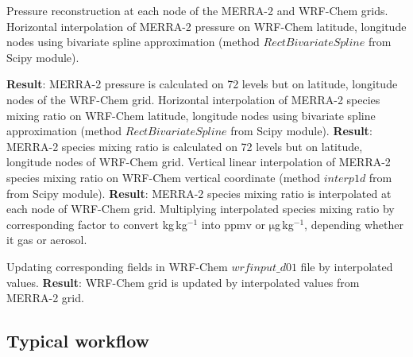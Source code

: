 \documentclass{article}
\newcommand{\unit}[1]{\ensuremath{\mathrm{#1}}}
\newcommand{\multiline}[1]{#1}
\begin{document}
\begin{algorithm}
\caption{Interpolation procedure applied to initial conditions.}
\label{fig:figA2}
\begin{algorithmic}[1]
    \State Pressure reconstruction at each node of the MERRA-2 and WRF-Chem grids.
    \Statex
\State \multiline{%
Horizontal interpolation of MERRA-2 pressure on WRF-Chem latitude, longitude nodes using bivariate spline approximation (method $RectBivariateSpline$ from Scipy module).}

	\EndFor
	\State \textbf{Result}: MERRA-2 pressure is calculated on 72 levels but on latitude, longitude nodes of the WRF-Chem grid.
    \Statex
            \State \multiline{%
            Horizontal interpolation of MERRA-2 species mixing ratio on WRF-Chem latitude, longitude nodes using bivariate spline approximation (method $RectBivariateSpline$ from Scipy module).}
        \EndFor
        \State \multiline{%
        \textbf{Result}: MERRA-2 species mixing ratio is calculated on 72 levels but on latitude, longitude nodes of WRF-Chem grid.}
        \Statex
        \Statex
            \State \multiline{%
            Vertical linear interpolation of MERRA-2 species mixing ratio on WRF-Chem vertical coordinate (method $interp1d$ from from Scipy module). }
        \EndFor
        \State \multiline{%
        \textbf{Result}: MERRA-2 species mixing ratio is interpolated at each node of WRF-Chem grid.}
        \Statex
        \Statex
        \State \multiline{%
        Multiplying interpolated species mixing ratio by corresponding factor to convert kg\,kg$^{-1}$ into \unit{ppmv} or \unit{\mu}g\,kg$^{-1}$, depending whether it gas or aerosol.}
        
        \State \multiline{%
        Updating corresponding fields in WRF-Chem $wrfinput\_d01$ file by interpolated values.}
	\EndFor
	\State \textbf{Result}: WRF-Chem grid is updated by interpolated values from MERRA-2 grid.
\end{algorithmic}
\end{algorithm}

\subsection{Typical workflow}
\end{document}

